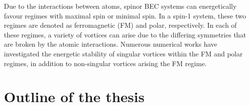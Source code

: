 Due to the interactions between atoms, spinor BEC systems can energetically
favour regimes with maximal spin or minimal spin.
In a spin-1 system, these two regimes are denoted as ferromagnetic (FM) and
polar, respectively.
In each of these regimes, a variety of vortices can arise due to the differing
symmetries that are broken by the atomic interactions.
Numerous numerical works have investigated the energetic stability of singular
vortices within the FM and polar regimes, in addition to non-singular vortices
arising the FM regime.


\section{Outline of the thesis}
